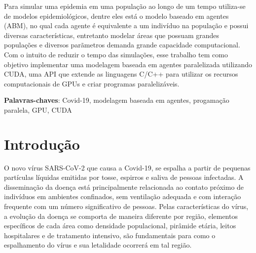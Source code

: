 \documentclass[
	12pt,				%
	openright,			%
	oneside,			%
	a4paper,			%
	english,			%
	french,				%
	spanish,			%
	brazil				%
	]{abntex2}
\begin{document}



\imprimirfolhaderosto*

\setlength{\absparsep}{18pt} %

\begin{resumo}

Para simular uma epidemia em uma população ao longo de um tempo utiliza-se de modelos epidemiológicos, dentre eles está o modelo baseado em agentes (ABM), no qual cada agente é equivalente a um indivíduo na população e possui diversas características, entretanto modelar áreas que possuam grandes populações e diversos parãmetros demanda grande capacidade computacional. Com o intuito de reduzir o tempo das simulações, esse trabalho tem como objetivo implementar uma modelagem baseada em agentes paralelizada utilizando CUDA, uma API que extende as linguagens C/C++ para utilizar os recursos computacionais de GPUs e criar programas paralelizáveis. 

\textbf{Palavras-chaves}: Covid-19, modelagem baseada em agentes, progamação paralela, GPU, CUDA

\end{resumo}

\tableofcontents

\chapter{Introdução}
\label{Intro}
O novo vírus SARS-CoV-2 que causa a Covid-19, se espalha a partir de pequenas partículas líquidas emitidas  por tosse, espirros e saliva de pessoas infectadas. 
A disseminação da doença está principalmente relacionada ao contato próximo de indivíduos em ambientes confinados, sem ventilação adequada e com interação frequente com um número significativo de pessoas. Pelas características do vírus, a evolução da doença se comporta de maneira diferente por região, elementos específicos de cada área como densidade populacional, pirâmide etária, leitos hospitalares e de tratamento intensivo, são fundamentais para como o espalhamento do vírus e sua letalidade ocorrerá em tal região.
\end{document}
